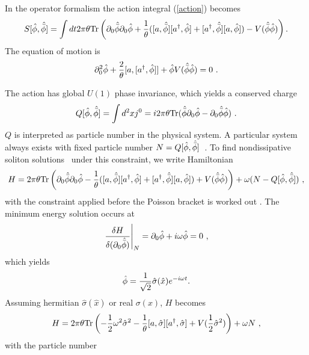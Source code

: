 \documentclass[a4paper,a4paper]{article}
\def\Tr{{\hbox{Tr}}}
\def\hbphi{\hat{\bar{\phi}}} \def\hsigma{\hat{\sigma}}
\begin{document}
In the operator formalism the action
integral (\ref{action}) becomes
\begin{equation}
S[\hat{\phi}, \hat{\bar{\phi}}]=\int
dt2\pi\theta\mbox{Tr}\left(\partial_0\hbphi\partial_0\hphi+\frac
1\theta([a,\hbphi][a^\dag,\hphi]+
[a^\dag,\hbphi][a,\hphi])-V(\hat{\bar{\phi}}\hat{\phi})\right).
\end{equation}
The equation of motion is
\begin{equation}
\partial_0^2\hphi+\frac 2\theta[a,[a^\dag,\hphi]]+\hphi
V(\hbphi\hphi)=0\ .                                                                                 \label{EqnM}
\end{equation}

The action has global $U(1)$ phase invariance, which yields a conserved charge
\begin{equation}
Q[\hphi,\hbphi]=\int d^2x
j^0=i2\pi\theta\mbox{Tr}(\hat{\bar{\phi}}\partial_0
\hat{\phi}-\partial_0\hat{\bar{\phi}}\hat{\phi})\ .                                                  \label{ConCharge}
\end{equation}                                                                                        
$Q$ is interpreted as particle number in the physical system. A
particular system always exists with fixed particle number
$N=Q[\hphi,\hbphi]$\ .  To find nondissipative soliton
solutions~\cite{LeeReport,Coleman} under this constraint, we write Hamiltonian
\begin{equation}
H=2\pi\theta\mbox{Tr}\left(\partial_0\hbphi\partial_0\hphi-\frac
1\theta([a,\hbphi][a^\dag,\hphi]+
[a^\dag,\hbphi][a,\hphi])+V(\hat{\bar{\phi}}\hat{\phi})\right)+\omega(N-Q[\hphi,\hbphi])\ ,
\end{equation}
with the constraint applied before the Poisson bracket is worked out \cite{Dirac}. 
The minimum energy solution occurs at
\begin{equation}
\left.\frac{\delta
H}{\delta(\partial_0\hbphi)}\right|_N=\partial_0\hphi+i\omega\hphi=0\
,
\end{equation}
which yields 
\begin{equation}
\hphi=\frac 1{\sqrt{2}}\hsigma(\hat{x})e^{-i\omega t}.
\end{equation}
Assuming hermitian $\hsigma(\hat{x})$ or real $\sigma(x)$, $H$ becomes
\begin{equation}
H=2\pi\theta\Tr\left(-\frac 12\omega^2\hsigma^2-\frac
1\theta[a,\hsigma][a^\dag,\hsigma]+V(\frac 12\hsigma^2)\right)+\omega
N\ ,\label{NHam}
\end{equation}
with the particle number
\end{document}
